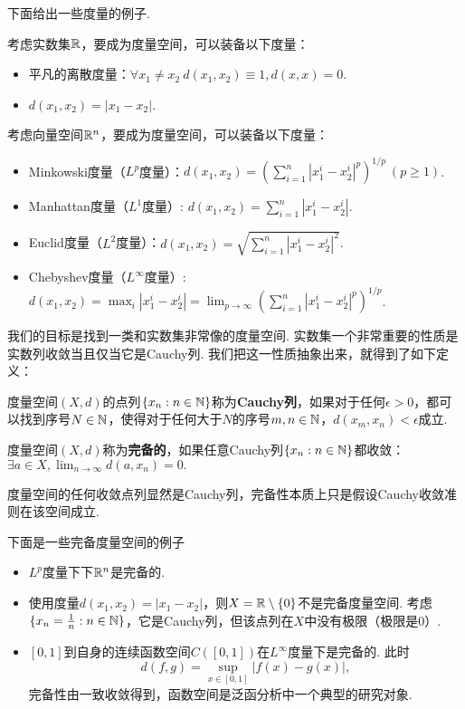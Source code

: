 下面给出一些度量的例子. 
\begin{example}
    考虑实数集$\mathbb{R}$，要成为度量空间，可以装备以下度量：
    \begin{itemize}
            \item 平凡的离散度量：$\forall x_1\neq x_2\ d(x_1,x_2)\equiv 1, d(x,x)=0$. 
            \item $d(x_1,x_2)=|x_1-x_2|$. 
        \end{itemize}
        考虑向量空间$\mathbb{R}^n$，要成为度量空间，可以装备以下度量：
        \begin{itemize}
            \item Minkowski度量（$L^p$度量）：$d(x_1,x_2)=(\sum_{i=1}^n|x_1^i-x_2^i|^p)^{1/p}\ (p\ge 1)$. 
            \item Manhattan度量（$L^1$度量）: $d(x_1,x_2)=\sum_{i=1}^n|x_1^i-x_2^i|$. 
            \item Euclid度量（$L^2$度量）：$d(x_1,x_2)=\sqrt{\sum_{i=1}^n|x_1^i-x_2^i|^2}$. 
            \item Chebyshev度量（$L^\infty$度量）: $d(x_1,x_2)=\max_i|x_1^i-x_2^i|=\lim_{p\to\infty}(\sum_{i=1}^n|x_1^i-x_2^i|^p)^{1/p}$. 
        \end{itemize}
\end{example}

我们的目标是找到一类和实数集非常像的度量空间. 实数集一个非常重要的性质是实数列收敛当且仅当它是Cauchy列. 我们把这一性质抽象出来，就得到了如下定义：

\begin{example}
    度量空间$(X,d)$的点列$\{x_n:n\in \mathbb{N}\}$称为\textbf{Cauchy列}，如果对于任何$\epsilon>0$，都可以找到序号$N\in\mathbb{N}$，使得对于任何大于$N$的序号$m,n\in\mathbb{N}$，$d(x_m,x_n)<\epsilon$成立.

    度量空间$(X,d)$称为\textbf{完备的}，如果任意Cauchy列$\{x_n:n\in \mathbb{N}\}$都收敛：$\exists a\in X, \lim_{n\to\infty}d(a,x_n)=0.$
\end{example}
度量空间的任何收敛点列显然是Cauchy列，完备性本质上只是假设Cauchy收敛准则在该空间成立.

下面是一些完备度量空间的例子
\begin{example}
\begin{itemize}
\item $L^p$度量下下$\mathbb{R}^n$是完备的.
\item 使用度量$d(x_1,x_2)=|x_1-x_2|$，则$X=\mathbb{R}\setminus\{0\}$不是完备度量空间. 考虑$\{x_n=\frac1n:n\in\mathbb{N}\}$，它是Cauchy列，但该点列在$X$中没有极限（极限是$0$）.

\item $[0,1]$到自身的连续函数空间$C([0,1])$在$L^\infty$度量下是完备的.
此时
\[d(f,g)=\sup_{x\in[0,1]}|f(x)-g(x)|,\]
完备性由一致收敛得到，函数空间是泛函分析中一个典型的研究对象.
\end{itemize}
\end{example}

